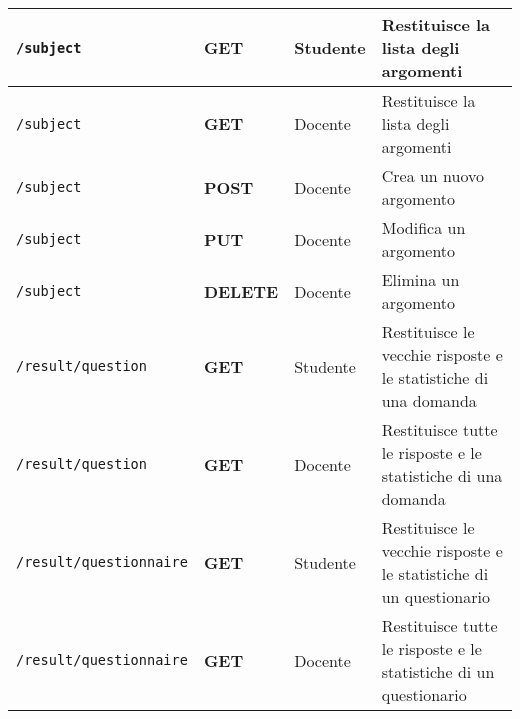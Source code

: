 \documentclass[12pt,a4paper]{article}
\begin{document}
\begin{center}
\begin{longtable}[H]{p{} p{} p{} p{}}
		\midrule
		\midrule
		\texttt{/subject} & \textbf{GET} & Studente & Restituisce la lista degli argomenti \\*
		\midrule
		\texttt{/subject} & \textbf{GET} & Docente & Restituisce la lista degli argomenti \\*
		\midrule
		\texttt{/subject} & \textbf{POST} & Docente & Crea un nuovo argomento \\*
		\midrule
		\texttt{/subject} & \textbf{PUT} & Docente & Modifica un argomento \\*
		\midrule
		\texttt{/subject} & \textbf{DELETE} & Docente & Elimina un argomento \\*
		
		
		\midrule
		\midrule
		\texttt{/result/question} & \textbf{GET} & Studente & Restituisce le vecchie risposte e le statistiche di una domanda \\*
		\midrule
		\texttt{/result/question} & \textbf{GET} & Docente & Restituisce tutte le risposte e le statistiche di una domanda \\*
		\midrule
		\texttt{/result/questionnaire} & \textbf{GET} & Studente & Restituisce le vecchie risposte e le statistiche di un questionario \\*
		\midrule
		\texttt{/result/questionnaire} & \textbf{GET} & Docente & Restituisce tutte le risposte e le statistiche di un questionario \\*
		

\end{longtable}
\end{center}
\end{document}

